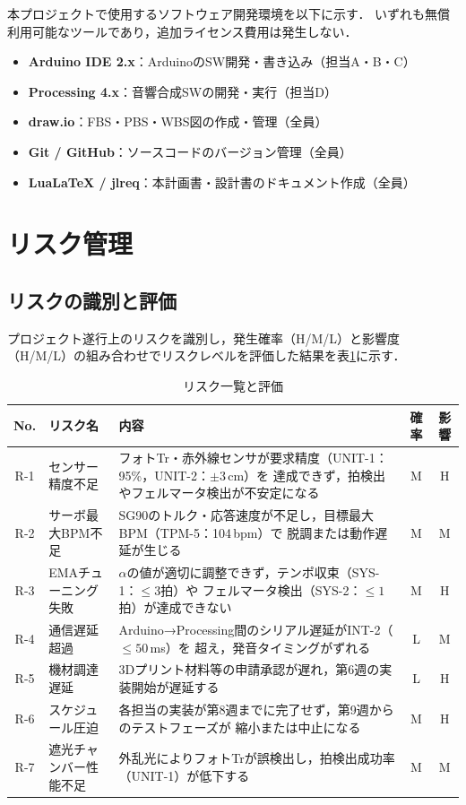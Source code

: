 \documentclass[lualatex,book,paper=a4paper,jafontsize=11.5pt,jafontscale=1.05,oneside]{jlreq}
\begin{document}
本プロジェクトで使用するソフトウェア開発環境を以下に示す．
いずれも無償利用可能なツールであり，追加ライセンス費用は発生しない．

\begin{itemize}
  \item \textbf{Arduino IDE 2.x}：ArduinoのSW開発・書き込み（担当A・B・C）
  \item \textbf{Processing 4.x}：音響合成SWの開発・実行（担当D）
  \item \textbf{draw.io}：FBS・PBS・WBS図の作成・管理（全員）
  \item \textbf{Git / GitHub}：ソースコードのバージョン管理（全員）
  \item \textbf{LuaLaTeX / jlreq}：本計画書・設計書のドキュメント作成（全員）
\end{itemize}

\section{リスク管理}

\subsection{リスクの識別と評価}

プロジェクト遂行上のリスクを識別し，発生確率（H/M/L）と影響度（H/M/L）の組み合わせでリスクレベルを評価した結果を表\ref{tab:risk}に示す．

\begin{table}[H]
  \centering
  \caption{リスク一覧と評価}
  \label{tab:risk}
  \begin{tabularx}{\linewidth}{clXcc}
    \toprule
    No. & リスク名 & 内容 & 確率 & 影響 \\
    \midrule
    R-1 & センサー精度不足 &
      フォトTr・赤外線センサが要求精度（UNIT-1：95\%，UNIT-2：$\pm3\,$cm）を
      達成できず，拍検出やフェルマータ検出が不安定になる &
      M & H \\
    R-2 & サーボ最大BPM不足 &
      SG90のトルク・応答速度が不足し，目標最大BPM（TPM-5：104\,bpm）で
      脱調または動作遅延が生じる &
      M & M \\
    R-3 & EMAチューニング失敗 &
      $\alpha$の値が適切に調整できず，テンポ収束（SYS-1：$\leq3$拍）や
      フェルマータ検出（SYS-2：$\leq1$拍）が達成できない &
      M & H \\
    R-4 & 通信遅延超過 &
      Arduino→Processing間のシリアル遅延がINT-2（$\leq50\,$ms）を
      超え，発音タイミングがずれる &
      L & M \\
    R-5 & 機材調達遅延 &
      3Dプリント材料等の申請承認が遅れ，第6週の実装開始が遅延する &
      L & H \\
    R-6 & スケジュール圧迫 &
      各担当の実装が第8週までに完了せず，第9週からのテストフェーズが
      縮小または中止になる &
      M & H \\
    R-7 & 遮光チャンバー性能不足 &
      外乱光によりフォトTrが誤検出し，拍検出成功率（UNIT-1）が低下する &
      M & M \\
    \bottomrule
  \end{tabularx}
\end{table}
\end{document}
